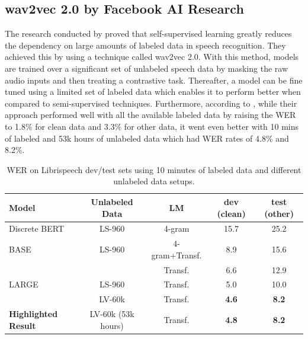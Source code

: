 \subsection{wav2vec 2.0 by Facebook AI Research}
The research conducted by \textcite{baevski2020wav2vec} proved that self-supervised learning greatly reduces the dependency on large amounts of labeled data in speech recognition. They achieved this by using a technique called wav2vec 2.0. With this method, models are trained over a significant set of unlabeled speech data by masking the raw audio inputs and then treating a contrastive task. Thereafter, a model can be fine tuned using a limited set of labeled data which enables it to perform better when compared to semi-supervised techniques. Furthermore, according to \textcite{baevski2020wav2vec}, while their approach performed well with all the available labeled data by raising the WER to 1.8\% for clean data and 3.3\% for other data, it went even better with 10 mins of labeled and 53k hours of unlabeled data which had WER rates of 4.8\% and 8.2\%.
\begin{table}[h!]
    \centering
    \caption{WER on Librispeech dev/test sets using 10 minutes of labeled data and different unlabeled data setups.}
    \begin{tabular}{@{}lcccc@{}}
    \toprule
    \textbf{Model}      & \textbf{Unlabeled Data} & \textbf{LM} & \textbf{dev (clean)} & \textbf{test (other)} \\ \midrule
    Discrete BERT  & LS-960                 & 4-gram  & 15.7           & 25.2           \\
    BASE                                     & LS-960                 & 4-gram+Transf. & 8.9            & 15.6           \\
                                             &                        & Transf.        & 6.6            & 12.9           \\
    LARGE                                    & LS-960                 & Transf.        & 5.0            & 10.0           \\
                                             & LV-60k                 & Transf.        & \textbf{4.6}   & \textbf{8.2}   \\ \midrule
    \textbf{Highlighted Result}     & LV-60k (53k hours)     & Transf.        & \textbf{4.8}   & \textbf{8.2}   \\ \bottomrule
    \end{tabular}
    \end{table}

